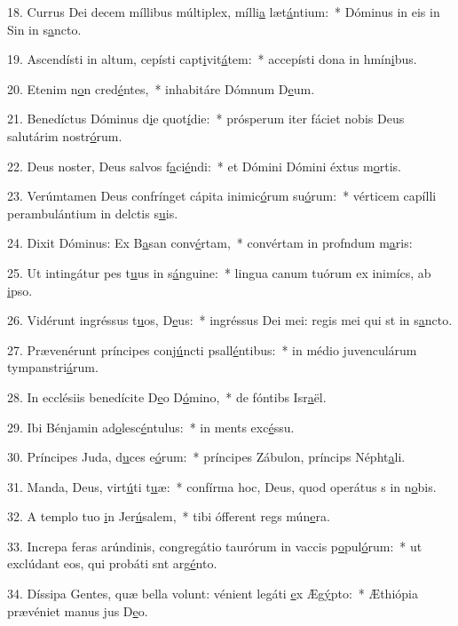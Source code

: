 18. Currus Dei decem míllibus múltiplex, mílli\uline{a} læt\uline{á}ntium:~* Dóminus in eis in Sin in s\uline{a}ncto.\par 
19. Ascendísti in altum, cepísti capt\uline{i}vit\uline{á}tem:~* accepísti dona in hmín\uline{i}bus.\par 
20. Etenim n\uline{o}n cred\uline{é}ntes,~* inhabitáre Dómnum D\uline{e}um.\par 
21. Benedíctus Dóminus d\uline{i}e quot\uline{í}die:~* prósperum iter fáciet nobis Deus salutárim nostr\uline{ó}rum.\par 
22. Deus noster, Deus salvos f\uline{a}ci\uline{é}ndi:~* et Dómini Dómini éxtus m\uline{o}rtis.\par 
23. Verúmtamen Deus confrínget cápita inimic\uline{ó}rum su\uline{ó}rum:~* vérticem capílli perambulántium in delctis s\uline{u}is.\par 
24. Dixit Dóminus: Ex B\uline{a}san conv\uline{é}rtam,~* convértam in profndum m\uline{a}ris:\par 
25. Ut intingátur pes t\uline{u}us in s\uline{á}nguine:~* lingua canum tuórum ex inimícs, ab \uline{i}pso.\par 
26. Vidérunt ingréssus t\uline{u}os, D\uline{e}us:~* ingréssus Dei mei: regis mei qui st in s\uline{a}ncto.\par 
27. Prævenérunt príncipes conj\uline{ú}ncti psall\uline{é}ntibus:~* in médio juvenculárum tympanstri\uline{á}rum.\par 
28. In ecclésiis benedícite D\uline{e}o D\uline{ó}mino,~* de fóntibs Isr\uline{a}ël.\par 
29. Ibi Bénjamin ad\uline{o}lesc\uline{é}ntulus:~* in ments exc\uline{é}ssu.\par 
30. Príncipes Juda, d\uline{u}ces e\uline{ó}rum:~* príncipes Zábulon, príncips Népht\uline{a}li.\par 
31. Manda, Deus, virt\uline{ú}ti t\uline{u}æ:~* confírma hoc, Deus, quod operátus s in n\uline{o}bis.\par 
32. A templo tuo \uline{i}n Jer\uline{ú}salem,~* tibi ófferent regs mún\uline{e}ra.\par 
33. Increpa feras arúndinis, congregátio taurórum in vaccis p\uline{o}pul\uline{ó}rum:~* ut exclúdant eos, qui probáti snt arg\uline{é}nto.\par 
34. Díssipa Gentes, quæ bella volunt: vénient legáti \uline{e}x Æg\uline{ý}pto:~* Æthiópia prævéniet manus jus D\uline{e}o.\par 
